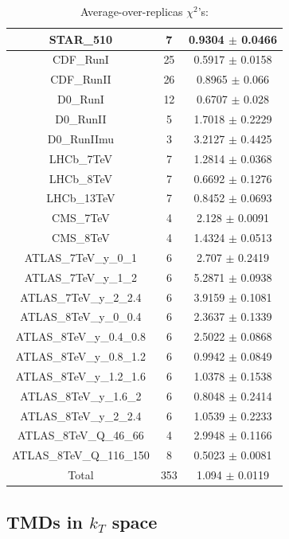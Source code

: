 \documentclass[
]{article}
\begin{document}
\begin{table}[h]
\begin{tabular}{|c|c|c|}
STAR\_510 & 7 & 0.9304 \(\pm\) 0.0466 \\ \hline
CDF\_RunI & 25 & 0.5917 \(\pm\) 0.0158 \\ \hline
CDF\_RunII & 26 & 0.8965 \(\pm\) 0.066 \\ \hline
D0\_RunI & 12 & 0.6707 \(\pm\) 0.028 \\ \hline
D0\_RunII & 5 & 1.7018 \(\pm\) 0.2229 \\ \hline
D0\_RunIImu & 3 & 3.2127 \(\pm\) 0.4425 \\ \hline
LHCb\_7TeV & 7 & 1.2814 \(\pm\) 0.0368 \\ \hline
LHCb\_8TeV & 7 & 0.6692 \(\pm\) 0.1276 \\ \hline
LHCb\_13TeV & 7 & 0.8452 \(\pm\) 0.0693 \\ \hline
CMS\_7TeV & 4 & 2.128 \(\pm\) 0.0091 \\ \hline
CMS\_8TeV & 4 & 1.4324 \(\pm\) 0.0513 \\ \hline
ATLAS\_7TeV\_y\_0\_1 & 6 & 2.707 \(\pm\) 0.2419 \\ \hline
ATLAS\_7TeV\_y\_1\_2 & 6 & 5.2871 \(\pm\) 0.0938 \\ \hline
ATLAS\_7TeV\_y\_2\_2.4 & 6 & 3.9159 \(\pm\) 0.1081 \\ \hline
ATLAS\_8TeV\_y\_0\_0.4 & 6 & 2.3637 \(\pm\) 0.1339 \\ \hline
ATLAS\_8TeV\_y\_0.4\_0.8 & 6 & 2.5022 \(\pm\) 0.0868 \\ \hline
ATLAS\_8TeV\_y\_0.8\_1.2 & 6 & 0.9942 \(\pm\) 0.0849 \\ \hline
ATLAS\_8TeV\_y\_1.2\_1.6 & 6 & 1.0378 \(\pm\) 0.1538 \\ \hline
ATLAS\_8TeV\_y\_1.6\_2 & 6 & 0.8048 \(\pm\) 0.2414 \\ \hline
ATLAS\_8TeV\_y\_2\_2.4 & 6 & 1.0539 \(\pm\) 0.2233 \\ \hline
ATLAS\_8TeV\_Q\_46\_66 & 4 & 2.9948 \(\pm\) 0.1166 \\ \hline
ATLAS\_8TeV\_Q\_116\_150 & 8 & 0.5023 \(\pm\) 0.0081 \\ \hline
Total & 353 & 1.094 \(\pm\) 0.0119 \\ \hline

\end{tabular}

\caption{Average-over-replicas \(\chi^2\)'s:}

\end{table}

\hypertarget{tmds-in-k_t-space}{%
\subsection{\texorpdfstring{TMDs in \(k_T\)
space}{TMDs in k\_T space}}\label{tmds-in-k_t-space}}
\end{document}
